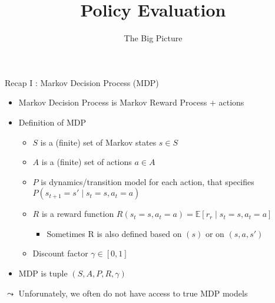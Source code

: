 


\title[Reinforcement Learning: Policy Evaluation]{Policy Evaluation}
\subtitle{The Big Picture}




	
	\maketitle

\begin{frame}[c]{Recap I : Markov Decision Process (MDP)}

\begin{itemize}
	\item Markov Decision Process is Markov Reward Process + actions
	\item Definition of MDP
	\begin{itemize}
		\item $S$ is a (finite) set of Markov states $s \in S$
		\item $A$ is a (finite) set of actions $a \in A$
		\item $P$ is dynamics/transition model for each action, that specifies $P(s_{t+1} = s' \mid s_t=s, a_t=a)$
		\item $R$ is a reward function 
		$R(s_t=s, a_t=a) = \mathbb{E}[r_r \mid s_t=s, a_t=a] $
		\begin{itemize}
			\item Sometimes R is also defined based on $(s)$ or on $(s,a,s')$
		\end{itemize}
		\item Discount factor $\gamma \in [0, 1]$
	\end{itemize}
	\item MDP is tuple $(S,A,P, R, \gamma)$
\end{itemize}

\pause

\medskip
$\leadsto$ Unforunately, we often do not have access to true MDP models

\end{frame}
